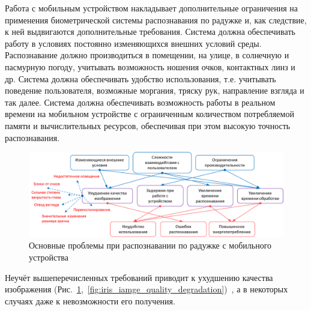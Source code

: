 Работа с мобильным устройством накладывает дополнительные ограничения на применения биометрической системы распознавания по радужке и, как следствие, к ней выдвигаются дополнительные требования. Система должна обеспечивать работу в условиях постоянно изменяющихся внешних условий среды. Распознавание должно производиться в помещении, на улице, в солнечную и пасмурную погоду, учитывать возможность ношения очков, контактных линз и др. Система должна обеспечивать удобство использования, т.е. учитывать поведение пользователя, возможные моргания, тряску рук, направление взгляда и так далее. Система должна обеспечивать возможность работы в реальном времени на мобильном устройстве с ограниченным количеством потребляемой памяти и вычислительных ресурсов, обеспечивая при этом высокую точность распознавания.

\begin{figure}[!h]
	\centering
	\includegraphics[width=0.95\columnwidth]{pictures/iris_mobile_problems.png}
	\caption{Основные проблемы при распознавании по радужке с мобильного устройства}
	\label{fig:iris_mobile_problems}
\end{figure}

Неучёт вышеперечисленных требований приводит к ухудшению качества изображения (Рис.~\ref{fig:iris_mobile_problems},~\ref{fig:iris_iamge_quality_degradation})~\cite{dorairaj_perf_eval}, а в некоторых случаях даже к невозможности его получения.


